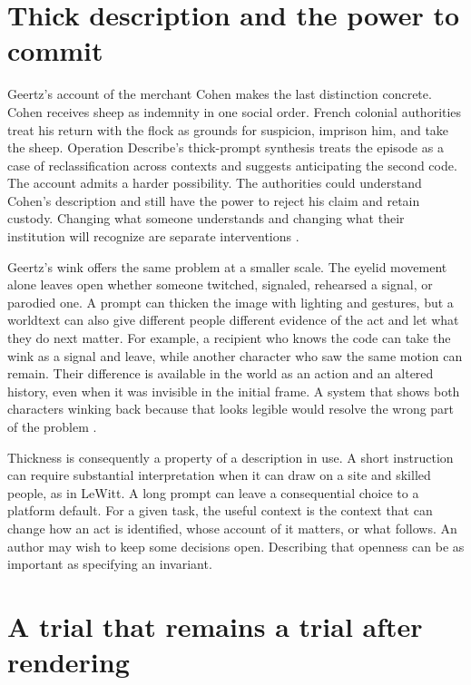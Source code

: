 \documentclass[11pt,letterpaper]{article}
\begin{document}
\section{Thick description and the power to commit}

Geertz’s account of the merchant Cohen makes the last distinction concrete. Cohen receives sheep as indemnity in one social order. French colonial authorities treat his return with the flock as grounds for suspicion, imprison him, and take the sheep. Operation Describe’s thick-prompt synthesis treats the episode as a case of reclassification across contexts and suggests anticipating the second code. The account admits a harder possibility. The authorities could understand Cohen’s description and still have the power to reject his claim and retain custody. Changing what someone understands and changing what their institution will recognize are separate interventions \citep{Geertz1973,ThickPrompt}.

Geertz’s wink offers the same problem at a smaller scale. The eyelid movement alone leaves open whether someone twitched, signaled, rehearsed a signal, or parodied one. A prompt can thicken the image with lighting and gestures, but a worldtext can also give different people different evidence of the act and let what they do next matter. For example, a recipient who knows the code can take the wink as a signal and leave, while another character who saw the same motion can remain. Their difference is available in the world as an action and an altered history, even when it was invisible in the initial frame. A system that shows both characters winking back because that looks legible would resolve the wrong part of the problem \citep{Geertz1973,ThickPrompt}.

Thickness is consequently a property of a description in use. A short instruction can require substantial interpretation when it can draw on a site and skilled people, as in LeWitt. A long prompt can leave a consequential choice to a platform default. For a given task, the useful context is the context that can change how an act is identified, whose account of it matters, or what follows. An author may wish to keep some decisions open. Describing that openness can be as important as specifying an invariant.

\section{A trial that remains a trial after rendering}
\end{document}

